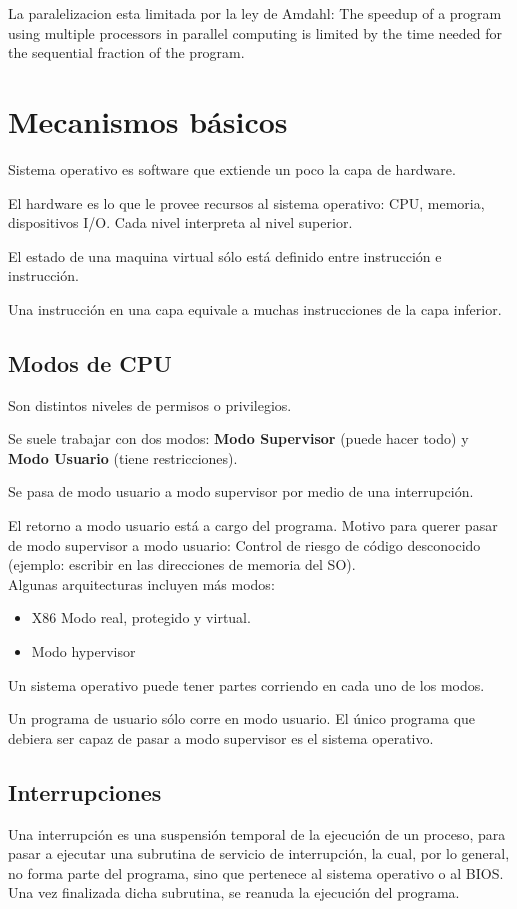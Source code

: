 \documentclass[a4paper, twoside]{article}
\begin{document}
La paralelizacion esta limitada por la ley de Amdahl: The speedup of a program using multiple processors in parallel computing is limited by the time needed for the sequential fraction of the program.

\newpage
\section{Mecanismos básicos}
Sistema operativo es software que extiende un poco la capa de hardware.

El hardware es lo que le provee recursos al sistema operativo: CPU, memoria, dispositivos I/O. Cada nivel interpreta al nivel superior.

El estado de una maquina virtual sólo está definido entre instrucción e instrucción.

Una instrucción en una capa equivale a muchas instrucciones de la capa inferior.

\subsection{Modos de CPU}
Son distintos niveles de permisos o privilegios.

Se suele trabajar con dos modos: \textbf{Modo Supervisor} (puede hacer todo) y \textbf{Modo Usuario} (tiene restricciones).

Se pasa de modo usuario a modo supervisor por medio de una interrupción. 

El retorno a modo usuario está a cargo del programa. Motivo para querer pasar de modo supervisor a modo usuario: Control de riesgo de código desconocido (ejemplo: escribir en las direcciones de memoria del SO).\\

Algunas arquitecturas incluyen más modos:
\begin{itemize}
	\item X86 Modo real, protegido y virtual.
	\item Modo hypervisor
\end{itemize}

Un sistema operativo puede tener partes corriendo en cada uno de los modos.

Un programa de usuario sólo corre en modo usuario. El único programa que debiera ser capaz de pasar a modo supervisor es el sistema operativo.

\subsection{Interrupciones}
Una interrupción es una suspensión temporal de la ejecución de un proceso, para pasar a ejecutar una subrutina de servicio de interrupción, la cual, por lo general, no forma parte del programa, sino que pertenece al sistema operativo o al BIOS. Una vez finalizada dicha subrutina, se reanuda la ejecución del programa.\\
\end{document}
